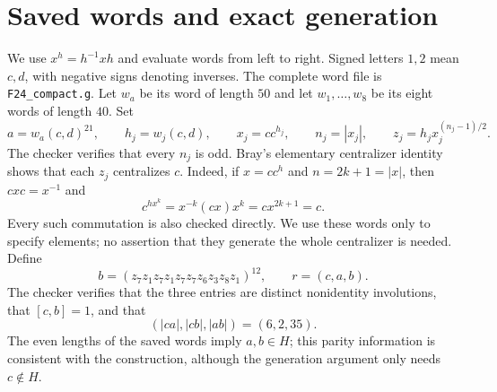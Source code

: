 \documentclass[11pt]{article}
\begin{document}
\section{Saved words and exact generation}
We use $x^h=h^{-1}xh$ and evaluate words from left to right. Signed letters $1,2$ mean $c,d$, with negative signs denoting inverses. The complete word file is \texttt{F24\_compact.g}. Let $w_a$ be its word of length $50$ and let $w_1,\ldots,w_8$ be its eight words of length $40$. Set
\[
 a=w_a(c,d)^{21},\qquad
 h_j=w_j(c,d),\qquad x_j=cc^{h_j},\qquad n_j=|x_j|,
 \qquad z_j=h_jx_j^{(n_j-1)/2}.
\]
The checker verifies that every $n_j$ is odd. Bray's elementary centralizer identity shows that each $z_j$ centralizes $c$. Indeed, if $x=cc^h$ and $n=2k+1=|x|$, then $cxc=x^{-1}$ and
\[
 c^{hx^k}=x^{-k}(cx)x^k=cx^{2k+1}=c.
\]
Every such commutation is also checked directly. We use these words only to specify elements; no assertion that they generate the whole centralizer is needed. Define
\[
 b=(z_7z_1z_7z_1z_7z_7z_6z_3z_8z_1)^{12},\qquad r=(c,a,b).
\]
The checker verifies that the three entries are distinct nonidentity involutions, that $[c,b]=1$, and that
\[
 (|ca|,|cb|,|ab|)=(6,2,35).
\]
The even lengths of the saved words imply $a,b\in H$; this parity information is consistent with the construction, although the generation argument only needs $c\notin H$.
\end{document}
